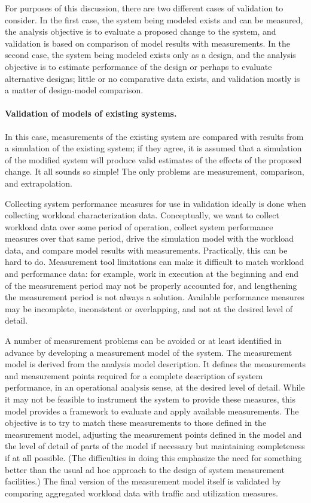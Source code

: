 For purposes of this discussion, there are two different cases of validation to
consider. In the first case, the system being modeled exists and can be
measured, the analysis objective is to evaluate a proposed change to the
system, and validation is based on comparison of model results with
measurements. In the second case, the system being modeled exists only as a
design, and the analysis objective is to estimate performance of the design or
perhaps to evaluate alternative designs; little or no comparative data exists,
and validation mostly is a matter of design-model comparison.

\paragraph{Validation of models of existing systems.}
In this case, measurements of the existing system are compared with results
from a simulation of the existing system; if they agree, it is assumed that a
simulation of the modified system will produce valid estimates of the effects
of the proposed change. It all sounds so simple! The only problems are
measurement, comparison, and extrapolation.

Collecting system performance measures for use in validation ideally is done
when collecting workload characterization data. Conceptually, we want to
collect workload data over some period of operation, collect system
performance measures over that same period, drive the simulation model with
the workload data, and compare model results with measurements. Practically,
this can be hard to do. Measurement tool limitations can make it difficult to
match workload and performance data: for example, work in execution at the
beginning and end of the measurement period may not be properly accounted
for, and lengthening the measurement period is not always a solution.
Available performance measures may be incomplete, inconsistent or overlapping,
and not at the desired level of detail.

A number of measurement problems can be avoided or at least identified in
advance by developing a measurement model of the system. The measurement
model is derived from the analysis model description. It defines the
measurements and measurement points required for a complete description of
system performance, in an operational analysis sense, at the desired level of
detail. While it may not be feasible to instrument the system to provide these
measures, this model provides a framework to evaluate and apply available
measurements. The objective is to try to match these measurements to those
defined in the measurement model, adjusting the measurement points defined in
the model and the level of detail of parts of the model if necessary but
maintaining completeness if at all possible. (The difficulties in doing this
emphasize the need for something better than the usual ad hoc approach to the
design of system measurement facilities.) The final version of the measurement
model itself is validated by comparing aggregated workload data with traffic
and utilization measures.

